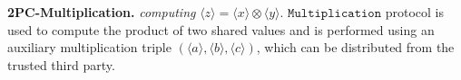 \documentclass[letterpaper]{article} %
\begin{document}

    \textbf{2PC-Multiplication.}
    \emph{computing}
    $ \langle z\rangle  = \langle x\rangle  \otimes \langle y\rangle $.
    $\mathtt{Multiplication}$ protocol is used to compute the product of two shared values
    and is performed using an auxiliary multiplication triple
    $(\langle a\rangle,\langle b\rangle,\langle c\rangle)$,
    which can be distributed from the trusted third party.
\end{document}
